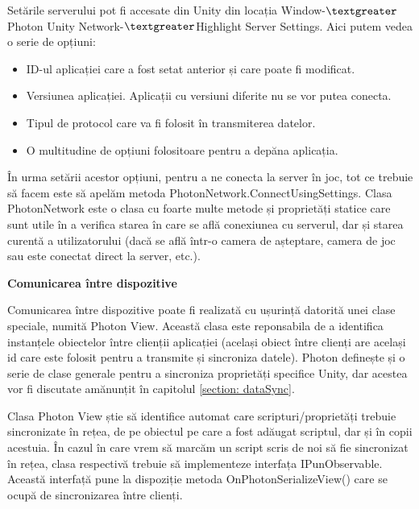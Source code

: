 \documentclass[12pt, a4paper]{article}
\begin{document}
	Setările serverului pot fi accesate din Unity din locația Window-$\textgreater$Photon Unity Network-$\textgreater$Highlight Server Settings. Aici putem vedea o serie de opțiuni:
	
	\begin{itemize}
		\item ID-ul aplicației care a fost setat anterior și care poate fi modificat.
		\item Versiunea aplicației. Aplicații cu versiuni diferite nu se vor putea conecta.
		\item Tipul de protocol care va fi folosit în transmiterea datelor.
		\item O multitudine de opțiuni folositoare pentru a depăna aplicația.
	\end{itemize}
	
	În urma setării acestor opțiuni, pentru a ne conecta la server în joc, tot ce trebuie să facem este să apelăm metoda PhotonNetwork.ConnectUsingSettings. Clasa PhotonNetwork este o clasa cu foarte multe metode și proprietăți statice care sunt utile în a verifica starea în care se află conexiunea cu serverul, dar și starea curentă a utilizatorului (dacă se află într-o camera de așteptare, camera de joc sau este conectat direct la server, etc.).
	\newline
	

	
	
	\textbf{Comunicarea între dispozitive}
	\newline
	
	Comunicarea între dispozitive poate fi realizată cu ușurință datorită unei clase speciale, numită Photon View. Această clasa este reponsabila de a identifica instanțele obiectelor între clienții aplicației (același obiect între clienți are același id care este folosit pentru a transmite și sincroniza datele). Photon definește și o serie de clase generale pentru a sincroniza proprietăți specifice Unity, dar acestea vor fi discutate amănunțit în capitolul \ref{section: dataSync}.
	\newline
	
	Clasa Photon View știe să identifice automat care scripturi/proprietăți trebuie sincronizate în rețea, de pe obiectul pe care a fost adăugat scriptul, dar și în copii acestuia. În cazul în care vrem să marcăm un script scris de noi să fie sincronizat în rețea, clasa respectivă trebuie să implementeze interfața IPunObservable. Această interfață pune la dispoziție metoda OnPhotonSerializeView() care se ocupă de sincronizarea între clienți.
	\newline
	
\end{document}
